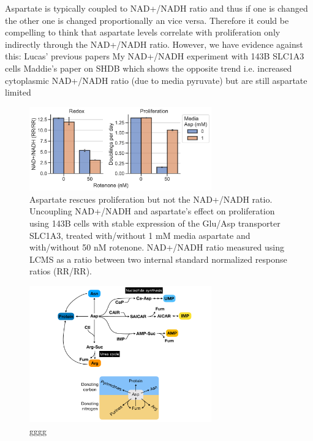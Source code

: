 Aspartate is typically coupled to NAD+/NADH ratio and thus if one is changed the other one is changed proportionally an vice versa.
Therefore it could be compelling to think that aspartate levels correlate with proliferation only indirectly through the NAD+/NADH ratio.
However, we have evidence against this:
Lucas' previous papers
My NAD+/NADH experiment with 143B SLC1A3 cells
Maddie's paper on SHDB which shows the opposite trend i.e. increased cytoplasmic NAD+/NADH ratio (due to media pyruvate) but are still aspartate limited



\begin{figure}
    \centering
    \includegraphics[width=0.70\textwidth]{figures/chap1/redox-prlfr_uncpl.pdf}
    \caption[Aspartate rescues proliferation but not the NAD+/NADH ratio]{
    Aspartate rescues proliferation but not the NAD+/NADH ratio.
    Uncoupling NAD+/NADH and aspartate's effect on proliferation using 143B cells with stable expression of the Glu/Asp transporter SLC1A3, treated with/without 1 mM media aspartate and with/without 50 nM rotenone.
    NAD+/NADH ratio measured using LCMS as a ratio between two internal standard normalized response ratios (RR/RR).
    }
    \label{fig:ch1:redox-prlfr_uncpl}
\end{figure}







\begin{figure}
    \centering
    \includegraphics[width=0.70\textwidth]{figures/chap1/asp_fates.pdf}
    \caption[Metabolic fates of aspartate]{
    gggg
    }
    \label{fig:ch1:asp_fates}
\end{figure}




